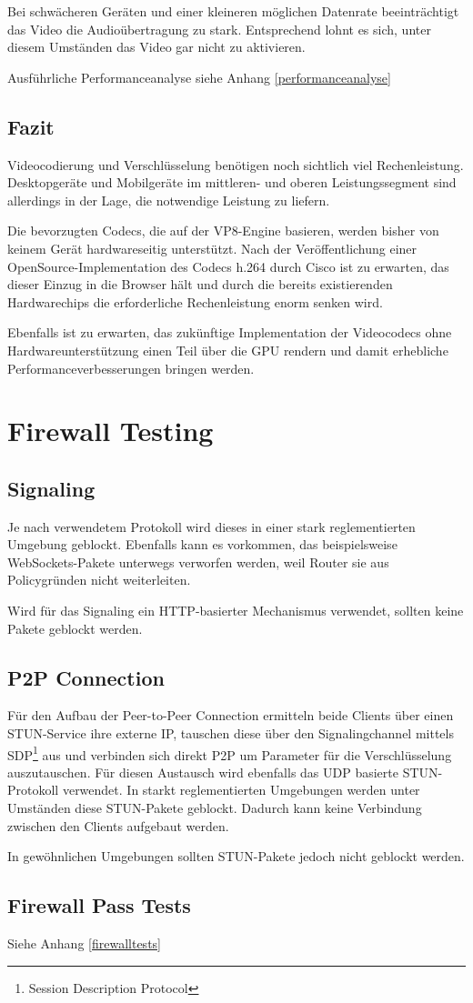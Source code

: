 		\vspace{0.5cm}
		Bei schwächeren Geräten und einer kleineren möglichen Datenrate beeinträchtigt das Video die Audioübertragung zu stark. Entsprechend lohnt es sich, unter diesem Umständen das Video gar nicht zu aktivieren.
			
		Ausführliche Performanceanalyse siehe Anhang \ref{performanceanalyse}
	
	\section{Fazit}
		Videocodierung und Verschlüsselung benötigen noch sichtlich viel Rechenleistung. Desktopgeräte und Mobilgeräte im mittleren- und oberen Leistungssegment sind allerdings in der Lage, die notwendige Leistung zu liefern.
		
		Die bevorzugten Codecs, die auf der VP8-Engine basieren, werden bisher von keinem Gerät hardwareseitig unterstützt. Nach der Veröffentlichung einer OpenSource-Implementation des Codecs h.264
		durch Cisco ist zu erwarten, das dieser Einzug in die Browser hält und durch die bereits existierenden Hardwarechips die erforderliche Rechenleistung enorm senken wird.
			
		Ebenfalls ist zu erwarten, das zukünftige Implementation der Videocodecs ohne Hardwareunterstützung einen Teil über die GPU rendern und damit erhebliche Performanceverbesserungen bringen werden.
			
	
	
\chapter{Firewall Testing}
	\section{Signaling}
		Je nach verwendetem Protokoll wird dieses in einer stark reglementierten
		Umgebung geblockt. Ebenfalls kann es vorkommen, das beispielsweise
		WebSockets-Pakete unterwegs verworfen werden, weil Router sie aus
		Policygründen nicht weiterleiten.
		
		Wird für das Signaling ein HTTP-basierter Mechanismus verwendet, sollten
		keine Pakete geblockt werden.

	\section{P2P Connection}
		Für den Aufbau der Peer-to-Peer Connection ermitteln beide Clients über einen
		STUN-Service ihre externe IP, tauschen diese über den Signalingchannel
		mittels SDP\footnote{Session Description Protocol} aus und verbinden sich
		direkt P2P um Parameter für die Verschlüsselung auszutauschen. Für diesen
		Austausch wird ebenfalls das UDP basierte STUN-Protokoll verwendet.
		In starkt reglementierten Umgebungen werden unter Umständen diese STUN-Pakete
		geblockt. Dadurch kann keine Verbindung zwischen den Clients aufgebaut werden.
		
		In gewöhnlichen Umgebungen sollten STUN-Pakete jedoch nicht geblockt werden.
	
	\section{Firewall Pass Tests}
		Siehe Anhang \ref{firewalltests}